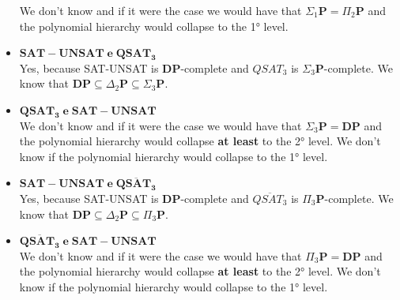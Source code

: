 \begin{itemize}
    We don't know and if it were the case we would have that $\Sigma_1\mathbf{P}=\Pi_2\mathbf{P}$ and the polynomial hierarchy would collapse to the 1° level.
    \item $\mathbf{SAT-UNSAT \; e \; QSAT_3}$\\
    Yes, because SAT-UNSAT is \textbf{DP}-complete and $QSAT_3$ is $\Sigma_3\mathbf{P}$-complete. We know that $\textbf{DP}\subseteq\Delta_2\mathbf{P}\subseteq\Sigma_3\mathbf{P}$.
    \item $\mathbf{ QSAT_3\; e \;SAT-UNSAT }$\\
    We don't know and if it were the case we would have that $\Sigma_3\mathbf{P}=\textbf{DP}$ and the polynomial hierarchy would collapse \textbf{at least} to the 2° level. We don't know if the polynomial hierarchy would collapse to the 1° level.
    \item $\mathbf{SAT-UNSAT \; e \; \overline{QSAT_3}}$\\
    Yes, because SAT-UNSAT is \textbf{DP}-complete and $\overline{QSAT_3}$ is $\Pi_3\mathbf{P}$-complete. We know that $\textbf{DP}\subseteq\Delta_2\mathbf{P}\subseteq\Pi_3\mathbf{P}$.
    \item $\mathbf{ \overline{QSAT_3}\; e \;SAT-UNSAT }$\\
    We don't know and if it were the case we would have that $\Pi_3\mathbf{P}=\textbf{DP}$ and the polynomial hierarchy would collapse \textbf{at least} to the 2° level. We don't know if the polynomial hierarchy would collapse to the 1° level.
\end{itemize}
